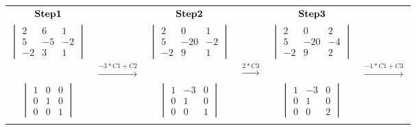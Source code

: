\documentclass[]{article}
\begin{document}
\begin{tabular}{ c c c c c c }
$\bold{Step 1}$ &  & $\bold{Step 2}$  &  & $\bold{Step 3}$ \\
$\begin{vmatrix} 2 & 6 & 1\\ 5 & -5 & -2 \\ -2 & 3 & 1 \end{vmatrix}$ &  & $\begin{vmatrix} 2 & 0 & 1\\ 5 & -20 & -2 \\ -2 & 9 & 1 \end{vmatrix}$ &  & $\begin{vmatrix} 2 & 0 & 2\\ 5 & -20 & -4 \\ -2 & 9 & 2 \end{vmatrix}$ \\  
 & $\xrightarrow{-3*C1 + C2}$ &  & $\xrightarrow{2*C3}$ & & $\xrightarrow{-1*C1+C3}$\\
$\begin{vmatrix} 1 &   0 &   0\\ 0 &   1 &   0 \\ 0 &   0 &   1 \end{vmatrix}$ &  & $\begin{vmatrix} 1 &   -3 &   0\\ 0 &   1 &   0 \\ 0 &   0 &   1 \end{vmatrix}$ &  & $\begin{vmatrix} 1 &   -3 &   0\\ 0 &   1 &   0 \\ 0 &   0 &   2 \end{vmatrix}$\\
 &  &  \\
\end{tabular}
\endgroup

\hspace{3cm}

\begingroup
\end{document}
